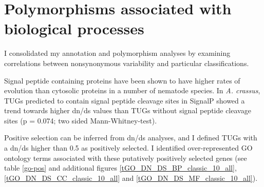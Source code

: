 
\section{Polymorphisms associated with biological processes}

I consolidated my annotation and polymorphism analyses by examining
correlations between nonsynonymous variability and particular
classifications.

Signal peptide containing proteins have been shown to have higher
rates of evolution than cytosolic proteins in a number of nematode
species. In \textit{A. crassus}, TUGs predicted to contain signal
peptide cleavage sites in SignalP showed a trend towards higher dn/ds
values than TUGs without signal peptide cleavage sites (p = 0.074; two
sided Mann-Whitney-test).

Positive selection can be inferred from dn/ds analyses, and I defined
TUGs with a dn/ds higher than 0.5 as positively selected. I identified
over-represented GO ontology terms associated with these putatively
positively selected genes (see table \ref{go-pos} and additional
figures \ref{tGO_DN_DS_BP_classic_10_all},
\ref{tGO_DN_DS_CC_classic_10_all} and
\ref{tGO_DN_DS_MF_classic_10_all}).

